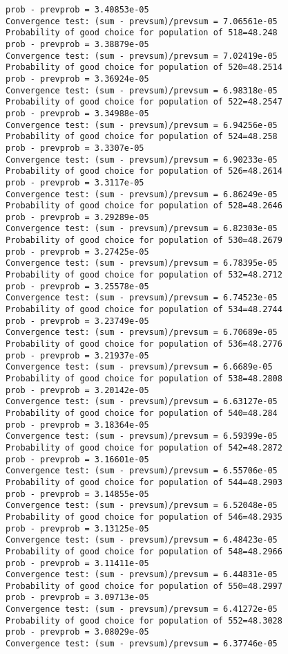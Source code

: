 \documentclass[11pt,onecolumn]{article}
\begin{document}
\begin{verbatim}
prob - prevprob = 3.40853e-05
Convergence test: (sum - prevsum)/prevsum = 7.06561e-05
Probability of good choice for population of 518=48.248
prob - prevprob = 3.38879e-05
Convergence test: (sum - prevsum)/prevsum = 7.02419e-05
Probability of good choice for population of 520=48.2514
prob - prevprob = 3.36924e-05
Convergence test: (sum - prevsum)/prevsum = 6.98318e-05
Probability of good choice for population of 522=48.2547
prob - prevprob = 3.34988e-05
Convergence test: (sum - prevsum)/prevsum = 6.94256e-05
Probability of good choice for population of 524=48.258
prob - prevprob = 3.3307e-05
Convergence test: (sum - prevsum)/prevsum = 6.90233e-05
Probability of good choice for population of 526=48.2614
prob - prevprob = 3.3117e-05
Convergence test: (sum - prevsum)/prevsum = 6.86249e-05
Probability of good choice for population of 528=48.2646
prob - prevprob = 3.29289e-05
Convergence test: (sum - prevsum)/prevsum = 6.82303e-05
Probability of good choice for population of 530=48.2679
prob - prevprob = 3.27425e-05
Convergence test: (sum - prevsum)/prevsum = 6.78395e-05
Probability of good choice for population of 532=48.2712
prob - prevprob = 3.25578e-05
Convergence test: (sum - prevsum)/prevsum = 6.74523e-05
Probability of good choice for population of 534=48.2744
prob - prevprob = 3.23749e-05
Convergence test: (sum - prevsum)/prevsum = 6.70689e-05
Probability of good choice for population of 536=48.2776
prob - prevprob = 3.21937e-05
Convergence test: (sum - prevsum)/prevsum = 6.6689e-05
Probability of good choice for population of 538=48.2808
prob - prevprob = 3.20142e-05
Convergence test: (sum - prevsum)/prevsum = 6.63127e-05
Probability of good choice for population of 540=48.284
prob - prevprob = 3.18364e-05
Convergence test: (sum - prevsum)/prevsum = 6.59399e-05
Probability of good choice for population of 542=48.2872
prob - prevprob = 3.16601e-05
Convergence test: (sum - prevsum)/prevsum = 6.55706e-05
Probability of good choice for population of 544=48.2903
prob - prevprob = 3.14855e-05
Convergence test: (sum - prevsum)/prevsum = 6.52048e-05
Probability of good choice for population of 546=48.2935
prob - prevprob = 3.13125e-05
Convergence test: (sum - prevsum)/prevsum = 6.48423e-05
Probability of good choice for population of 548=48.2966
prob - prevprob = 3.11411e-05
Convergence test: (sum - prevsum)/prevsum = 6.44831e-05
Probability of good choice for population of 550=48.2997
prob - prevprob = 3.09713e-05
Convergence test: (sum - prevsum)/prevsum = 6.41272e-05
Probability of good choice for population of 552=48.3028
prob - prevprob = 3.08029e-05
Convergence test: (sum - prevsum)/prevsum = 6.37746e-05

\end{verbatim}
\end{document}
